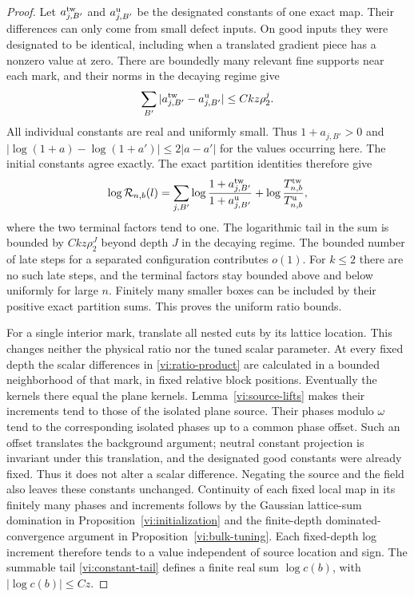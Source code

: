 \begin{proof}
Let $a_{j,B'}^{\rm tw}$ and $a_{j,B'}^{\rm u}$ be the designated
constants of one exact map.  Their differences can only come from small
defect inputs.  On good inputs they were designated to be identical,
including when a translated gradient piece has a nonzero value at zero.
There are boundedly many relevant fine supports near each mark, and
their norms in the decaying regime give
\begin{equation}
 \sum_{B'}|a_{j,B'}^{\rm tw}-a_{j,B'}^{\rm u}|
                      \le Ckz\rho_2^j.                  \label{vi:constant-tail}
\end{equation}
All individual constants are real and uniformly small.  Thus
$1+a_{j,B'}>0$ and
$|\log(1+a)-\log(1+a')|\le2|a-a'|$ for the values occurring here.
The initial constants agree exactly.  The exact partition identities
therefore give
\begin{equation}
 \log\mathcal R_{n,b}(l)
 =\sum_{j,B'}\log\frac{1+a_{j,B'}^{\rm tw}}
                            {1+a_{j,B'}^{\rm u}}
     +\log\frac{T^{\rm tw}_{n,b}}{T^{\rm u}_{n,b}},      \label{vi:ratio-product}
\end{equation}
where the two terminal factors tend to one.  The logarithmic tail in
the sum is bounded by $Ckz\rho_2^J$ beyond depth $J$ in the decaying
regime.  The bounded number of late steps for a separated configuration
contributes $o(1)$.  For $k\le2$ there are no such late steps, and the
terminal factors stay bounded above and below uniformly for large $n$.
Finitely many smaller boxes can be included by their positive exact
partition sums.  This proves the uniform ratio bounds.

For a single interior mark, translate all nested cuts by its lattice
location.  This changes neither the physical ratio nor the tuned scalar
parameter.  At every fixed depth the scalar differences in
\eqref{vi:ratio-product} are calculated in a bounded neighborhood of
that mark, in fixed relative block positions.  Eventually the kernels
there equal the plane kernels.  Lemma~\ref{vi:source-lifts} makes their
increments tend to those of the isolated plane source.  Their phases
modulo $\omega$ tend to the corresponding isolated phases up to a
common phase offset.  Such an offset translates the background argument;
neutral constant projection is invariant under this translation, and
the designated good constants were already fixed.  Thus it does not
alter a scalar difference.  Negating the source and the field also
leaves these constants unchanged.  Continuity of each fixed local map
in its finitely many phases and increments follows by the Gaussian
lattice-sum domination in Proposition~\ref{vi:initialization} and the
finite-depth dominated-convergence argument in
Proposition~\ref{vi:bulk-tuning}.  Each fixed-depth log increment
therefore tends to a value independent of source location and sign.
The summable tail \eqref{vi:constant-tail} defines a finite real sum
$\log c(b)$, with $|\log c(b)|\le Cz$.


\end{proof}

